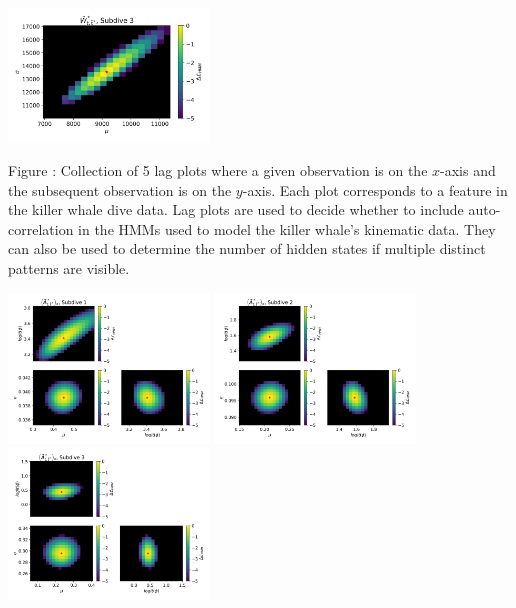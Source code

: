 \documentclass{article}
\begin{document}
        \begin{center}
        \includegraphics[width=2.1in]{../Plots/2019/20190902-182840-CATs_OB_1_0_267_CarHHMM2_fine-theta-likelihood-Ahat_low-2.png}
        \end{center}
        
        \noindent Figure : Collection of 5 lag plots where a given observation is on the $x$-axis and the subsequent observation is on the $y$-axis. Each plot corresponds to a feature in the killer whale dive data. Lag plots are used to decide whether to include auto-correlation in the HMMs used to model the killer whale's kinematic data. They can also be used to determine the number of hidden states if multiple distinct patterns are visible. 
        \addtocounter{fignum}{1}
        
        \begin{center}
        \includegraphics[width=2.1in]{../Plots/2019/20190902-182840-CATs_OB_1_0_267_CarHHMM2_fine-theta-likelihood-Ax-0.png}
        \includegraphics[width=2.1in]{../Plots/2019/20190902-182840-CATs_OB_1_0_267_CarHHMM2_fine-theta-likelihood-Ax-1.png}
        \includegraphics[width=2.1in]{../Plots/2019/20190902-182840-CATs_OB_1_0_267_CarHHMM2_fine-theta-likelihood-Ax-2.png}
        \end{center}
        
\end{document}
